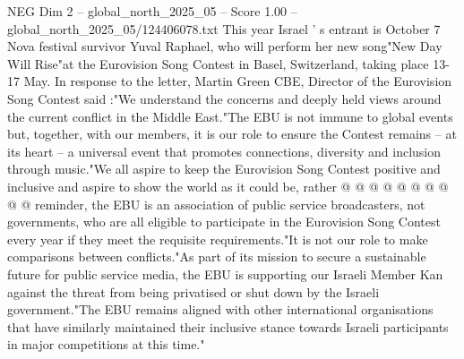 \begin{textsample}{NEG Dim 2 – global\_north\_2025\_05 – Score 1.00 – global\_north\_2025\_05/124406078.txt}
This year Israel ' s entrant is October 7 Nova festival survivor Yuval Raphael, who will perform her new song"New Day Will Rise"at the Eurovision Song Contest in Basel, Switzerland, taking place 13-17 May.
In response to the letter, Martin Green CBE, Director of the Eurovision Song Contest said :"We understand the concerns and deeply held views around the current conflict in the Middle East."The EBU is not immune to global events but, together, with our members, it is our role to ensure the Contest remains -- at its heart -- a universal event that promotes connections, diversity and inclusion through music."We all aspire to keep the Eurovision Song Contest positive and inclusive and aspire to show the world as it could be, rather @ @ @ @ @ @ @ @ @ @ reminder, the EBU is an association of public service broadcasters, not governments, who are all eligible to participate in the Eurovision Song Contest every year if they meet the requisite requirements."It is not our role to make comparisons between conflicts."As part of its mission to secure a sustainable future for public service media, the EBU is supporting our Israeli Member Kan against the threat from being privatised or shut down by the Israeli government."The EBU remains aligned with other international organisations that have similarly maintained their inclusive stance towards Israeli participants in major competitions at this time."

\end{textsample}
